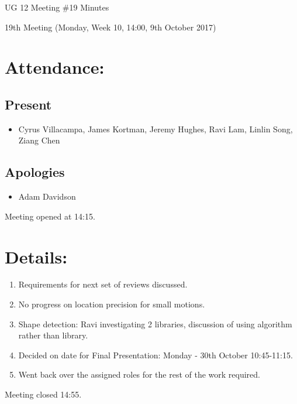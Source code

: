 \documentclass{article}
\begin{document}
\begin{adjustwidth}{2.5em}{0pt}
\begin{center}
\Large{UG 12 Meeting \#19 Minutes}\\
\end{center}
\end{adjustwidth}

19th Meeting (Monday, Week 10, 14:00, 9th October 2017)
\section{Attendance:}
\subsection*{Present}
\begin{itemize}
\item Cyrus Villacampa, James Kortman, Jeremy Hughes, Ravi Lam, Linlin Song, Ziang Chen
\end{itemize}
\subsection*{Apologies}
\begin{itemize}
\item Adam Davidson
\end {itemize}

Meeting opened at 14:15.
\section{Details:}
\begin{enumerate}
\item Requirements for next set of reviews discussed.
\item No progress on location precision for small motions.
\item Shape detection: Ravi investigating 2 libraries, discussion of using algorithm rather than library.
\item Decided on date for Final Presentation: Monday - 30th October 10:45-11:15.
\item Went back over the assigned roles for the rest of the work required.
\end{enumerate}

Meeting closed 14:55.
\end{document}
